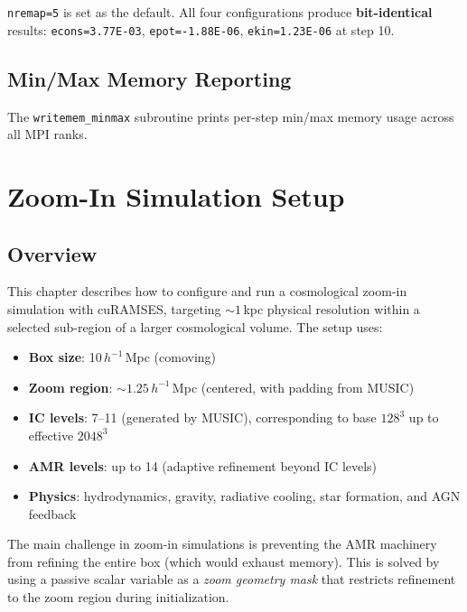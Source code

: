 \documentclass[11pt,fleqn]{book}
\begin{document}
\begin{infobox}
\texttt{nremap=5} is set as the default. All four configurations produce \textbf{bit-identical} results: \texttt{econs=3.77E-03}, \texttt{epot=-1.88E-06}, \texttt{ekin=1.23E-06} at step 10.
\end{infobox}

\section{Min/Max Memory Reporting}

The \texttt{writemem\_minmax} subroutine prints per-step min/max memory usage across all MPI ranks.


\chapter{Zoom-In Simulation Setup}
\label{ch:zoomin}

\section{Overview}

This chapter describes how to configure and run a cosmological zoom-in simulation with cuRAMSES, targeting ${\sim}1$\,kpc physical resolution within a selected sub-region of a larger cosmological volume. The setup uses:

\begin{itemize}[leftmargin=2em]
  \item \textbf{Box size}: 10\,$h^{-1}$\,Mpc (comoving)
  \item \textbf{Zoom region}: ${\sim}1.25$\,$h^{-1}$\,Mpc (centered, with padding from MUSIC)
  \item \textbf{IC levels}: 7--11 (generated by MUSIC), corresponding to base $128^3$ up to effective $2048^3$
  \item \textbf{AMR levels}: up to 14 (adaptive refinement beyond IC levels)
  \item \textbf{Physics}: hydrodynamics, gravity, radiative cooling, star formation, and AGN feedback
\end{itemize}

The main challenge in zoom-in simulations is preventing the AMR machinery from refining the entire box (which would exhaust memory). This is solved by using a passive scalar variable as a \emph{zoom geometry mask} that restricts refinement to the zoom region during initialization.
\end{document}
